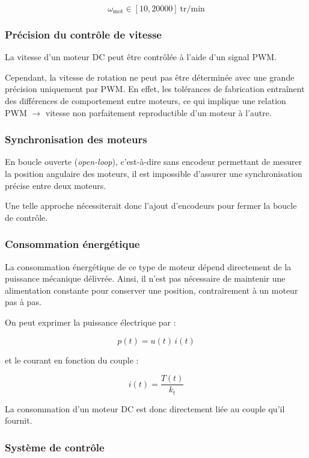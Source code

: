 $$
\omega_{\text{mot}} \in [10, 20000] \ \text{tr/min}
$$

\subsubsection{Précision du contrôle de vitesse}

La vitesse d'un moteur DC peut être contrôlée à l'aide d'un signal PWM.

Cependant, la vitesse de rotation ne peut pas être déterminée avec une grande précision uniquement par PWM. En effet, les tolérances de fabrication entraînent des différences de comportement entre moteurs, ce qui implique une relation PWM $\rightarrow$ vitesse non parfaitement reproductible d'un moteur à l'autre.

\subsubsection{Synchronisation des moteurs}

En boucle ouverte (\textit{open-loop}), c'est-à-dire sans encodeur permettant de mesurer la position angulaire des moteurs, il est impossible d'assurer une synchronisation précise entre deux moteurs.

Une telle approche nécessiterait donc l'ajout d'encodeurs pour fermer la boucle de contrôle.

\subsubsection{Consommation énergétique}

La consommation énergétique de ce type de moteur dépend directement de la puissance mécanique délivrée. Ainsi, il n'est pas nécessaire de maintenir une alimentation constante pour conserver une position, contrairement à un moteur pas à pas.

On peut exprimer la puissance électrique par :

$$
p(t) = u(t)\, i(t)
$$

et le courant en fonction du couple :

$$
i(t) = \frac{T(t)}{k_t}
$$

La consommation d'un moteur DC est donc directement liée au couple qu'il fournit.

\subsubsection{Système de contrôle}

